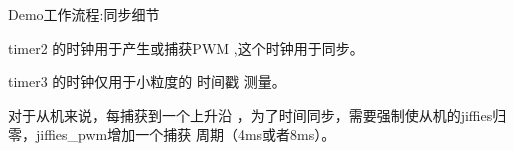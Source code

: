 \begin{frame}[fragile]{Demo工作流程:同步细节}

timer2 的时钟用于产生或捕获PWM ,这个时钟用于同步。

timer3 的时钟仅用于小粒度的 时间戳 测量。

对于从机来说，每捕获到一个上升沿 ，为了时间同步，需要强制使从机的jiffies归零，jiffies\_pwm增加一个捕获
周期（4ms或者8ms）。


\end{frame}
